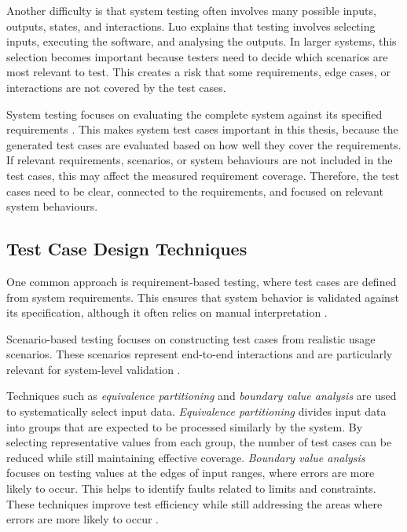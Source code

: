 \documentclass[a4paper,12pt]{article}
\begin{document}
Another difficulty is that system testing often involves many possible inputs, outputs, states, and interactions. Luo \cite{luo2001softwaretesting} explains that testing involves selecting inputs, executing the software, and analysing the outputs. In larger systems, this selection becomes important because testers need to decide which scenarios are most relevant to test. This creates a risk that some requirements, edge cases, or interactions are not covered by the test cases.

System testing focuses on evaluating the complete system against its specified requirements \cite{istqbSystemTesting}. This makes system test cases important in this thesis, because the generated test cases are evaluated based on how well they cover the requirements. If relevant requirements, scenarios, or system behaviours are not included in the test cases, this may affect the measured requirement coverage. Therefore, the test cases need to be clear, connected to the requirements, and focused on relevant system behaviours.

\subsection{Test Case Design Techniques}
One common approach is requirement-based testing, where test cases are defined from system requirements. This ensures that system behavior is validated against its specification, although it often relies on manual interpretation \cite{luo2001softwaretesting}.

Scenario-based testing focuses on constructing test cases from realistic usage scenarios. These scenarios represent end-to-end interactions and are particularly relevant for system-level validation \cite{sommerville2016software}.

Techniques such as \textit{equivalence partitioning} and \textit{boundary value analysis} are used to systematically select input data. 
\textit{Equivalence partitioning} divides input data into groups that are expected to be processed similarly by the system. By selecting representative values from each group, the number of test cases can be reduced while still maintaining effective coverage.
\textit{Boundary value analysis} focuses on testing values at the edges of input ranges, where errors are more likely to occur. This helps to identify faults related to limits and constraints.
These techniques improve test efficiency while still addressing the areas where errors are more likely to occur \cite{sommerville2016software}.
\end{document}
